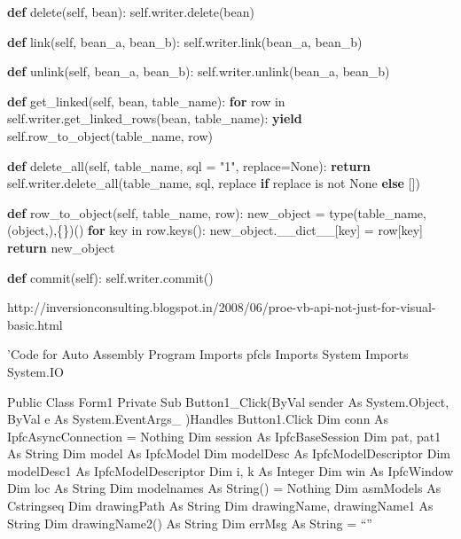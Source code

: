 \documentclass[]{article}
\newenvironment{Shaded}{}{}
\newcommand{\KeywordTok}[1]{\textcolor[rgb]{0.00,0.44,0.13}{\textbf{{#1}}}}
\newcommand{\DataTypeTok}[1]{\textcolor[rgb]{0.56,0.13,0.00}{{#1}}}
\newcommand{\StringTok}[1]{\textcolor[rgb]{0.25,0.44,0.63}{{#1}}}
\newcommand{\OtherTok}[1]{\textcolor[rgb]{0.00,0.44,0.13}{{#1}}}
\newcommand{\NormalTok}[1]{{#1}}
\begin{document}
\begin{Shaded}
\begin{Highlighting}[]
    \KeywordTok{def} \NormalTok{delete(}\OtherTok{self}\NormalTok{, bean):}
        \OtherTok{self}\NormalTok{.writer.delete(bean)}
    
    \KeywordTok{def} \NormalTok{link(}\OtherTok{self}\NormalTok{, bean_a, bean_b):}
        \OtherTok{self}\NormalTok{.writer.link(bean_a, bean_b)}
    
    \KeywordTok{def} \NormalTok{unlink(}\OtherTok{self}\NormalTok{, bean_a, bean_b):}
        \OtherTok{self}\NormalTok{.writer.unlink(bean_a, bean_b)}
    
    \KeywordTok{def} \NormalTok{get_linked(}\OtherTok{self}\NormalTok{, bean, table_name):}
        \KeywordTok{for} \NormalTok{row in }\OtherTok{self}\NormalTok{.writer.get_linked_rows(bean, table_name):}
            \KeywordTok{yield} \OtherTok{self}\NormalTok{.row_to_object(table_name, row)}

    \KeywordTok{def} \NormalTok{delete_all(}\OtherTok{self}\NormalTok{, table_name, sql = }\StringTok{"1"}\NormalTok{, replace=}\OtherTok{None}\NormalTok{):}
        \KeywordTok{return} \OtherTok{self}\NormalTok{.writer.delete_all(table_name, sql, replace }\KeywordTok{if} \NormalTok{replace is not }\OtherTok{None} \KeywordTok{else} \NormalTok{[])}

    \KeywordTok{def} \NormalTok{row_to_object(}\OtherTok{self}\NormalTok{, table_name, row):}
        \NormalTok{new_object = }\DataTypeTok{type}\NormalTok{(table_name,(}\DataTypeTok{object}\NormalTok{,),\{\})()}
        \KeywordTok{for} \NormalTok{key in row.keys():}
            \NormalTok{new_object.__dict__[key] = row[key]}
        \KeywordTok{return} \NormalTok{new_object}

    \KeywordTok{def} \NormalTok{commit(}\OtherTok{self}\NormalTok{):}
        \OtherTok{self}\NormalTok{.writer.commit()}
\end{Highlighting}
\end{Shaded}

http://inversionconsulting.blogspot.in/2008/06/proe-vb-api-not-just-for-visual-basic.html

'Code for Auto Assembly Program Imports pfcls Imports System Imports
System.IO

Public Class Form1 Private Sub Button1\_Click(ByVal sender As
System.Object, ByVal e As System.EventArgs\_ )Handles Button1.Click Dim
conn As IpfcAsyncConnection = Nothing Dim session As IpfcBaseSession Dim
pat, pat1 As String Dim model As IpfcModel Dim modelDesc As
IpfcModelDescriptor Dim modelDesc1 As IpfcModelDescriptor Dim i, k As
Integer Dim win As IpfcWindow Dim loc As String Dim modelnames As
String() = Nothing Dim asmModels As Cstringseq Dim drawingPath As String
Dim drawingName, drawingName1 As String Dim drawingName2() As String Dim
errMsg As String = ``''
\end{document}
